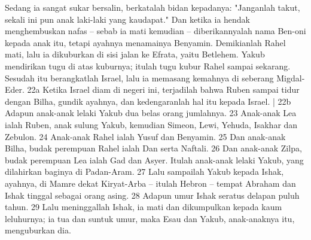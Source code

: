 \begin{biblechapter}
\verse Sedang ia sangat sukar bersalin, berkatalah bidan kepadanya: "Janganlah takut, sekali ini pun anak laki-laki yang kaudapat."
\verse Dan ketika ia hendak menghembuskan nafas -- sebab ia mati kemudian -- diberikannyalah nama Ben-oni kepada anak itu, tetapi ayahnya menamainya Benyamin.
\verse Demikianlah Rahel mati, lalu ia dikuburkan di sisi jalan ke Efrata, yaitu Betlehem.
\verse Yakub mendirikan tugu di atas kuburnya; itulah tugu kubur Rahel sampai sekarang.
\verse Sesudah itu berangkatlah Israel, lalu ia memasang kemahnya di seberang Migdal-Eder. 22a Ketika Israel diam di negeri ini, terjadilah bahwa Ruben sampai tidur dengan Bilha, gundik ayahnya, dan kedengaranlah hal itu kepada Israel. | 22b Adapun anak-anak lelaki Yakub dua belas orang jumlahnya. 23 Anak-anak Lea ialah Ruben, anak sulung Yakub, kemudian Simeon, Lewi, Yehuda, Isakhar dan Zebulon. 24 Anak-anak Rahel ialah Yusuf dan Benyamin. 25 Dan anak-anak Bilha, budak perempuan Rahel ialah Dan serta Naftali. 26 Dan anak-anak Zilpa, budak perempuan Lea ialah Gad dan Asyer. Itulah anak-anak lelaki Yakub, yang dilahirkan baginya di Padan-Aram. 27 Lalu sampailah Yakub kepada Ishak, ayahnya, di Mamre dekat Kiryat-Arba -- itulah Hebron -- tempat Abraham dan Ishak tinggal sebagai orang asing. 28 Adapun umur Ishak seratus delapan puluh tahun. 29 Lalu meninggallah Ishak, ia mati dan dikumpulkan kepada kaum leluhurnya; ia tua dan suntuk umur, maka Esau dan Yakub, anak-anaknya itu, menguburkan dia.
\end{biblechapter}

